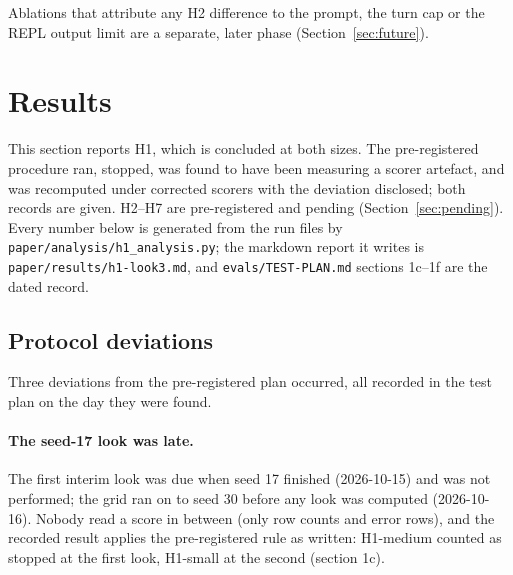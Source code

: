\documentclass[11pt]{article}
\newcommand{\code}[1]{\texttt{#1}}
\begin{document}
Ablations that attribute any H2 difference to the prompt, the turn cap or the REPL
output limit are a separate, later phase (Section~\ref{sec:future}).

\section{Results}
\label{sec:results}

This section reports H1, which is concluded at both sizes. The pre-registered procedure
ran, stopped, was found to have been measuring a scorer artefact, and was recomputed
under corrected scorers with the deviation disclosed; both records are given. H2--H7 are
pre-registered and pending (Section~\ref{sec:pending}). Every number below is generated
from the run files by \code{paper/analysis/h1\_analysis.py}; the markdown report it
writes is \code{paper/results/h1-look3.md}, and \code{evals/TEST-PLAN.md} sections
1c--1f are the dated record.

\subsection{Protocol deviations}
\label{sec:deviations}

Three deviations from the pre-registered plan occurred, all recorded in the test plan on
the day they were found.

\paragraph{The seed-17 look was late.} The first interim look was due when seed 17
finished (2026-10-15) and was not performed; the grid ran on to seed 30 before any look
was computed (2026-10-16). Nobody read a score in between (only row counts and error
rows), and the recorded result applies the pre-registered rule as written: H1-medium
counted as stopped at the first look, H1-small at the second (section 1c).
\end{document}
